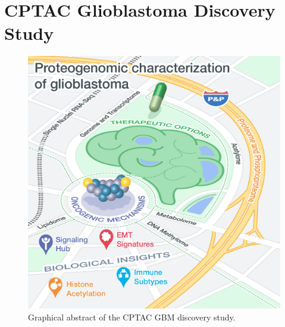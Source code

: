 \chapter{CPTAC Glioblastoma Discovery Study}
\label{chap:cptac-gbm-discov}


\begin{figure}[tbp]
    \centering
    \includegraphics[height=0.5\textheight]{figures/chap04_cptac_gbm_discov/graphical_abstract.png}
    \caption{Graphical abstract of the CPTAC GBM discovery study.}
    \label{fig:gbm-graphical-abstract}
\end{figure}

